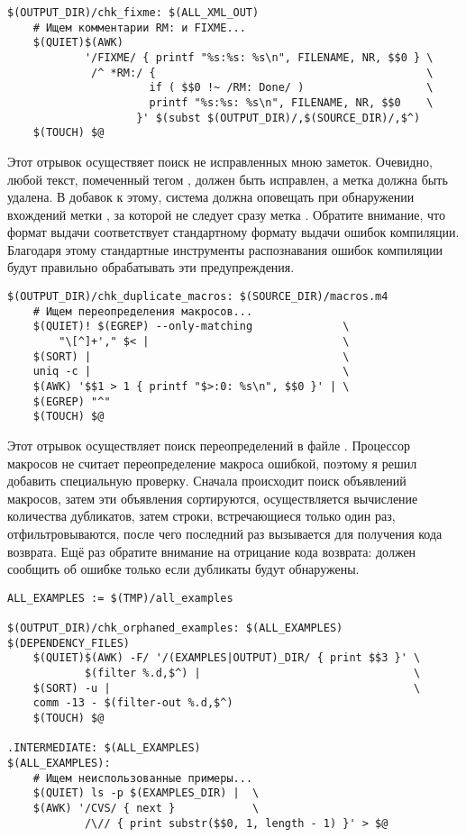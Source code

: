 \begin{verbatim}
$(OUTPUT_DIR)/chk_fixme: $(ALL_XML_OUT)
    # Ищем комментарии RM: и FIXME...
    $(QUIET)$(AWK)
            '/FIXME/ { printf "%s:%s: %s\n", FILENAME, NR, $$0 } \
             /^ *RM:/ {                                          \
                      if ( $$0 !~ /RM: Done/ )                   \
                      printf "%s:%s: %s\n", FILENAME, NR, $$0    \
                    }' $(subst $(OUTPUT_DIR)/,$(SOURCE_DIR)/,$^)
    $(TOUCH) $@
\end{verbatim}

Этот отрывок осуществяет поиск не исправленных мною заметок. Очевидно,
любой текст, помеченный тегом , должен быть исправлен,
а метка должна быть удалена. В добавок к этому, система должна
оповещать при обнаружении вхождений метки \command{RM:}, за которой не
следует сразу метка \command{Done}. Обратите внимание, что формат
выдачи \function{printf} соответствует стандартному формату выдачи
ошибок компиляции. Благодаря этому стандартные инструменты
распознавания ошибок компиляции будут правильно обрабатывать эти
предупреждения.

\begin{verbatim}
$(OUTPUT_DIR)/chk_duplicate_macros: $(SOURCE_DIR)/macros.m4
    # Ищем переопределения макросов...
    $(QUIET)! $(EGREP) --only-matching              \
        "\[^]+'," $< |                              \
    $(SORT) |                                       \
    uniq -c |                                       \
    $(AWK) '$$1 > 1 { printf "$>:0: %s\n", $$0 }' | \
    $(EGREP) "^"
    $(TOUCH) $@
\end{verbatim}

Этот отрывок осуществляет поиск переопределений в файле
\filename{macros.m4}. Процессор макросов не считает переопределение
макроса ошибкой, поэтому я решил добавить специальную
проверку. Сначала происходит поиск объявлений макросов, затем эти
объявления сортируются, осуществляется вычисление количества
дубликатов, затем строки, встречающиеся только один раз,
отфильтровываются, после чего последний раз вызывается 
для получения кода возврата. Ещё раз обратите внимание на отрицание
кода возврата: \GNUmake{} должен сообщить об ошибке только если
дубликаты будут обнаружены.

\begin{verbatim}
ALL_EXAMPLES := $(TMP)/all_examples

$(OUTPUT_DIR)/chk_orphaned_examples: $(ALL_EXAMPLES) $(DEPENDENCY_FILES)
    $(QUIET)$(AWK) -F/ '/(EXAMPLES|OUTPUT)_DIR/ { print $$3 }' \
            $(filter %.d,$^) |                                 \
    $(SORT) -u |                                               \
    comm -13 - $(filter-out %.d,$^)
    $(TOUCH) $@

.INTERMEDIATE: $(ALL_EXAMPLES)
$(ALL_EXAMPLES):
    # Ищем неиспользованные примеры...
    $(QUIET) ls -p $(EXAMPLES_DIR) |  \
    $(AWK) '/CVS/ { next }            \
            /\// { print substr($$0, 1, length - 1) }' > $@
\end{verbatim}

